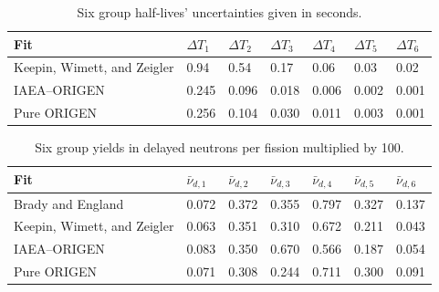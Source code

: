 \documentclass{style/nseJournal}
\begin{document}
\begin{table}[]
\caption{Six group half-lives' uncertainties given in seconds.}
\centering
\begin{tabular}{|l l l l l l l|} 
 \hline
 Fit & $\Delta T_1$ & $\Delta T_2$ & $\Delta T_3$ & $\Delta T_4$ & $\Delta T_5$ & $\Delta T_6$\\
 \hline\hline
    Keepin, Wimett, and Zeigler \cite{KEEPIN1957IN2} & 0.94 & 0.54 & 0.17 & 0.06 & 0.03 & 0.02\\
    IAEA--ORIGEN & 0.245 & 0.096 & 0.018 & 0.006 & 0.002 & 0.001 \\
    Pure ORIGEN & 0.256 & 0.104 & 0.030 & 0.011 & 0.003 & 0.001 \\
 \hline
\end{tabular}
\label{table:half-lives-delta}
\end{table}

\begin{table}[]
\caption{Six group yields in delayed neutrons per fission multiplied by 100.}
\centering
\begin{tabular}{|l l l l l l l|} 
 \hline
 Fit & $\bar{\nu}_{d, 1}$ & $\bar{\nu}_{d, 2}$ & $\bar{\nu}_{d, 3}$ & $\bar{\nu}_{d, 4}$ & $\bar{\nu}_{d, 5}$ & $\bar{\nu}_{d, 6}$\\
 \hline\hline
    Brady and England \cite{doi:10.13182/NSE103-129} & 0.072 & 0.372 & 0.355 & 0.797 & 0.327 & 0.137\\
    Keepin, Wimett, and Zeigler \cite{KEEPIN1957IN2} & 0.063 & 0.351 & 0.310 & 0.672 & 0.211 & 0.043 \\
    IAEA--ORIGEN & 0.083 & 0.350 & 0.670 & 0.566 & 0.187 & 0.054 \\
    Pure ORIGEN & 0.071 & 0.308 & 0.244 & 0.711 & 0.300 & 0.091\\
 \hline
\end{tabular}
\label{table:group-yields}
\end{table}
\end{document}
